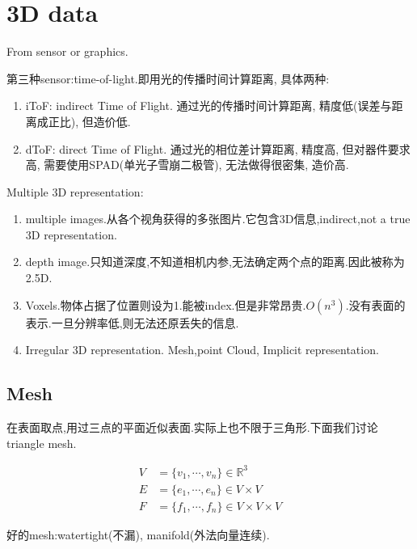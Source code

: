 \section{3D data}

From sensor or graphics.

第三种sensor:time-of-light.即用光的传播时间计算距离, 具体两种:

\begin{enumerate}
    \item iToF: indirect Time of Flight. 通过光的传播时间计算距离, 精度低(误差与距离成正比), 但造价低.
    \item dToF: direct Time of Flight. 通过光的相位差计算距离, 精度高, 但对器件要求高, 需要使用SPAD(单光子雪崩二极管), 无法做得很密集, 造价高.
\end{enumerate}

Multiple 3D representation:

\begin{enumerate}
    \item multiple images.从各个视角获得的多张图片.它包含3D信息,indirect,not a true 3D representation.
    \item depth image.只知道深度,不知道相机内参,无法确定两个点的距离.因此被称为2.5D.
    \item Voxels.物体占据了位置则设为1.能被index.但是非常昂贵.$O(n^3)$.没有表面的表示.一旦分辨率低,则无法还原丢失的信息.
    \item Irregular 3D representation. Mesh,point Cloud, Implicit representation.
\end{enumerate}

\subsection{Mesh}

在表面取点,用过三点的平面近似表面.实际上也不限于三角形.下面我们讨论triangle mesh.

\begin{equation}
    \begin{aligned}
        V &= \{v_1, \cdots, v_n\} \in \mathbb R^3
        \\
        E &= \{e_1, \cdots, e_n\} \in V\times V
        \\
        F &= \{f_1, \cdots, f_n\} \in V\times V \times V
    \end{aligned}
\end{equation}


好的mesh:watertight(不漏), manifold(外法向量连续).

